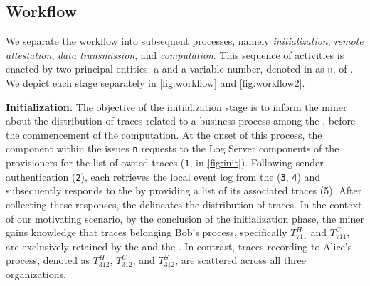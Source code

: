 \subsection{Workflow}

We separate the workflow into subsequent processes, namely \textit{initialization}, \textit{remote attestation}, \textit{data transmission}, and \textit{computation}. This sequence of activities is enacted by two principal entities: a  and a variable number, denoted in as \texttt{n}, of . We depict each stage separately in \cref{fig:workflow} and \cref{fig:workflow2}.

\textbf{Initialization.} The objective of the initialization stage is to inform the miner about the distribution of traces related to a business process among the , before the commencement of the computation. At the onset of this process, the  component within the  issues \texttt{n} requests to the Log Server components of the provisioners for the list of owned traces (\texttt{1}, in \cref{fig:init}). Following sender authentication (\texttt{2}), each  retrieves the local event log from the  (\texttt{3}, \texttt{4}) and subsequently responds to the  by providing a list of its associated traces (5). After collecting these  responses, the  delineates the distribution of traces. In the context of our motivating scenario, by the conclusion of the initialization phase, the miner gains knowledge that traces belonging Bob's process, specifically $T^H_{711}$ and $T^C_{711}$, are exclusively retained by the  and the . In contrast, traces recording to Alice's process, denoted as $T^H_{312}$, $T^C_{312}$, and $T^S_{312}$, are scattered across all three organizations.


